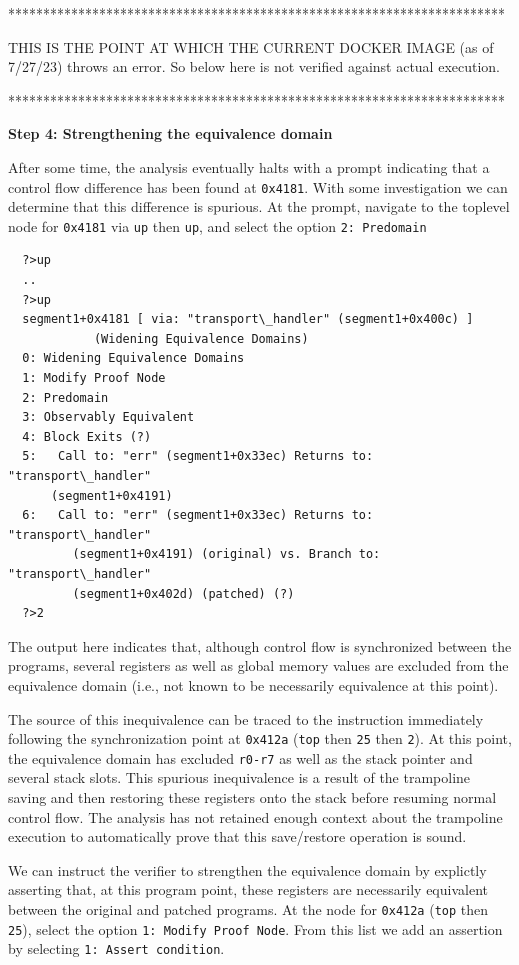 ***********************************************************************

THIS IS THE POINT AT WHICH THE CURRENT DOCKER IMAGE (as of 7/27/23) throws an error.
So below here is not verified against actual execution.

***********************************************************************

\noindent\textbf{Step 4: Strengthening the equivalence domain}

After some time, the analysis eventually halts with a prompt indicating that a control flow difference has been found at \texttt{0x4181}.
With some investigation we can determine that this difference is spurious.
At the prompt, navigate to the toplevel node for \texttt{0x4181} via \texttt{up} then \texttt{up}, and select the option \texttt{2: Predomain}
\begin{verbatim}
  ?>up
  ..
  ?>up
  segment1+0x4181 [ via: "transport\_handler" (segment1+0x400c) ]
            (Widening Equivalence Domains)
  0: Widening Equivalence Domains
  1: Modify Proof Node
  2: Predomain
  3: Observably Equivalent
  4: Block Exits (?)
  5:   Call to: "err" (segment1+0x33ec) Returns to: "transport\_handler"
      (segment1+0x4191)
  6:   Call to: "err" (segment1+0x33ec) Returns to: "transport\_handler"
         (segment1+0x4191) (original) vs. Branch to: "transport\_handler"
         (segment1+0x402d) (patched) (?)
  ?>2
\end{verbatim}

The output here indicates that, although control flow is synchronized between the programs, several registers as well as global memory values are excluded from the equivalence domain (i.e., not known to be necessarily equivalence at this point).

The source of this inequivalence can be traced to the instruction immediately following the synchronization point at \texttt{0x412a} (\texttt{top} then \texttt{25} then \texttt{2}).
At this point, the equivalence domain has excluded \texttt{r0-r7} as well as the stack pointer and several stack slots.
This spurious inequivalence is a result of the trampoline saving and then restoring these registers onto the stack before resuming normal control flow.
The analysis has not retained enough context about the trampoline execution to automatically prove that this save/restore operation is sound.

We can instruct the verifier to strengthen the equivalence domain by explictly asserting that, at this program point, these registers are necessarily equivalent between the original and patched programs.
At the node for \texttt{0x412a} (\texttt{top} then \texttt{25}), select the option \texttt{1: Modify Proof Node}.
From this list we add an assertion by selecting \texttt{1: Assert condition}.

